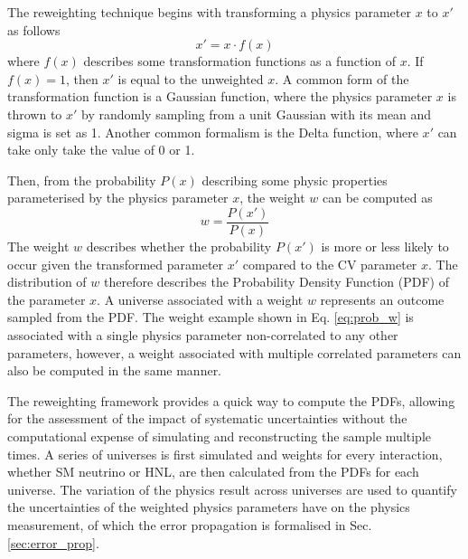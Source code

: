 The reweighting technique begins with transforming a physics parameter $x$ to $x'$ as follows
\begin{equation}
	x' = x \cdot f(x)
\end{equation}
where $f(x)$ describes some transformation functions as a function of $x$. 
If $f(x) = 1$, then $x'$ is equal to the unweighted $x$.
A common form of the transformation function  is a Gaussian function, where the physics parameter $x$ is thrown to $x'$ by randomly sampling from a unit Gaussian with its mean and sigma is set as 1.
Another common formalism is the Delta function, where $x'$ can take only take the value of 0 or 1. 


Then, from the probability $P(x)$ describing some physic properties parameterised by the physics parameter $x$, the weight $w$ can be computed as
\begin{equation}
\label{eq:prob_w}
	w = \frac{P(x')}{P(x)}
\end{equation}
The weight $w$ describes whether the probability $P(x')$ is more or less likely to occur given the transformed parameter $x'$ compared to the CV parameter $x$.
The distribution of $w$ therefore describes the Probability Density Function (PDF) of the parameter $x$.
A universe associated with a weight $w$ represents an outcome sampled from the PDF.
The weight example shown in Eq. \ref{eq:prob_w} is associated with a single physics parameter non-correlated to any other parameters, however, a weight associated with multiple correlated parameters can also be computed in the same manner.

The reweighting framework provides a quick way to compute the PDFs, allowing for the assessment of the impact of systematic uncertainties without the computational expense of simulating and reconstructing the sample multiple times.
A series of universes is first simulated and weights for every interaction, whether SM neutrino or HNL, are then calculated from the PDFs for each universe.
The variation of the physics result across universes are used to quantify the uncertainties of the weighted physics parameters have on the physics measurement, of which the error propagation is formalised in Sec. \ref{sec:error_prop}.  

